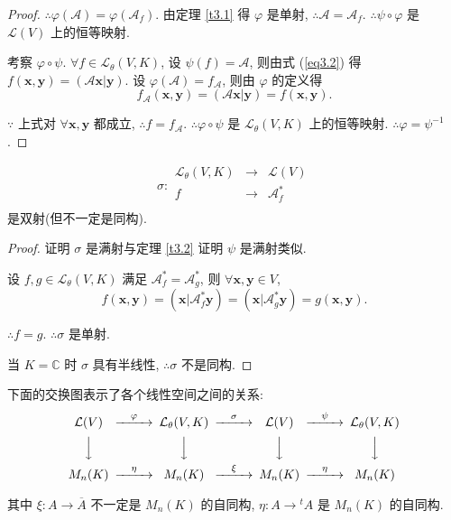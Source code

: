 \documentclass[color=black,device=normal,lang=cn,mode=geye]{elegantnote}
\begin{document}
\begin{proof}
    $\therefore\varphi(\mathcal{A})=\varphi(\mathcal{A}_f)$. 由定理 \ref{t3.1} 得 $\varphi$ 是单射, $\therefore\mathcal{A}=\mathcal{A}_f$. $\therefore\psi\circ\varphi$ 是 $\mathcal{L}(V)$ 上的恒等映射.
    
    考察 $\varphi\circ\psi$. $\forall f\in\mathcal{L}_\theta(V,K)$, 设 $\psi(f)=\mathcal{A}$, 则由式 (\ref{eq3.2}) 得 $f(\boldsymbol{x},\boldsymbol{y})=(\mathcal{A}\boldsymbol{x}|\boldsymbol{y})$. 设 $\varphi(\mathcal{A})=f_\mathcal{A}$, 则由 $\varphi$ 的定义得
    \[f_\mathcal{A}(\boldsymbol{x},\boldsymbol{y})=(\mathcal{A}\boldsymbol{x}|\boldsymbol{y})=f(\boldsymbol{x},\boldsymbol{y}).\]
    
    $\because$ 上式对 $\forall\boldsymbol{x},\boldsymbol{y}$ 都成立, $\therefore f=f_\mathcal{A}$. $\therefore\varphi\circ\psi$ 是 $\mathcal{L}_\theta(V,K)$ 上的恒等映射. $\therefore\varphi=\psi^{-1}$.
\end{proof}
\begin{theorem}
    \[\sigma:\begin{array}{rcl}
        \mathcal{L}_\theta(V,K) & \to & \mathcal{L}(V) \\
        f & \to & \mathcal{A}^*_f \\
    \end{array}\]
    是双射(但不一定是同构).
\end{theorem}
\begin{proof}
    证明 $\sigma$ 是满射与定理 \ref{t3.2} 证明 $\psi$ 是满射类似.

    设 $f,g\in\mathcal{L}_\theta(V,K)$ 满足 $\mathcal{A}^*_f=\mathcal{A}^*_g$, 则 $\forall\boldsymbol{x},\boldsymbol{y}\in V$,
    \[f(\boldsymbol{x},\boldsymbol{y})=(\boldsymbol{x}|\mathcal{A}^*_f\boldsymbol{y})=(\boldsymbol{x}|\mathcal{A}^*_g\boldsymbol{y})=g(\boldsymbol{x},\boldsymbol{y}).\]

    $\therefore f=g$. $\therefore\sigma$ 是单射.

    当 $K=\mathbb{C}$ 时 $\sigma$ 具有半线性, $\therefore\sigma$ 不是同构.
\end{proof}
下面的交换图表示了各个线性空间之间的关系:
\[\begin{CD}
    \mathcal{L}(V) @>\varphi>> \mathcal{L}_\theta(V,K) @>\sigma>> \mathcal{L}(V) @>\psi>> \mathcal{L}_\theta(V,K) \\
    @VVV @VVV @VVV @VVV \\
    M_n(K) @>\eta>> M_n(K) @>\xi>> M_n(K) @>\eta>> M_n(K)
\end{CD}\]

其中 $\xi:A\to\overline{A}$ 不一定是 $M_n(K)$ 的自同构, $\eta:A\to{}^tA$ 是 $M_n(K)$ 的自同构.
\end{document}

